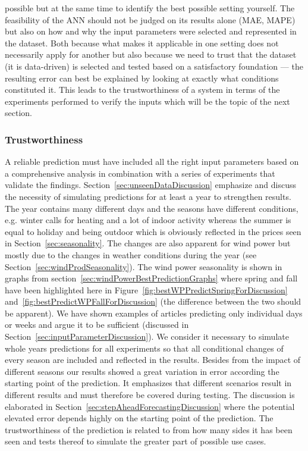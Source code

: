 possible but at the same time to identify the best possible setting yourself. The feasibility of the ANN should not be judged on its results alone (MAE, MAPE) but also on how and why the input parameters were selected and represented in the dataset. Both because what makes it applicable in one setting does not necessarily apply for another but also because we need to trust that the dataset (it is data-driven) is selected and tested based on a satisfactory foundation --- the resulting error can best be explained by looking at exactly what conditions constituted it. This leads to the trustworthiness of a system in terms of the experiments performed to verify the inputs which will be the topic of the next section.  

\todo{show the article that]}


\subsubsection{Trustworthiness}
A reliable prediction must have included all the right input parameters based on a comprehensive analysis in combination with a series of experiments that validate the findings. Section~\ref{sec:unseenDataDiscussion} emphasize and discuss the necessity of simulating predictions for at least a year to strengthen results. The year contains many different days and the seasons have different conditions, e.g. winter calls for heating and a lot of indoor activity whereas the summer is equal to holiday and being outdoor which is obviously reflected in the prices seen in Section~\ref{sec:seasonality}. The changes are also apparent for wind power but mostly due to the changes in weather conditions during the year (see Section~\ref{sec:windProdSeasonality}). The wind power seasonality is shown in graphs from section~\ref{sec:windPowerBestPredictionGraphs} where spring and fall have been highlighted here in Figure~\ref{fig:bestWPPredictSpringForDiscussion} and~\ref{fig:bestPredictWPFallForDiscussion} (the difference between the two should be apparent). We have shown examples of articles predicting only individual days or weeks and argue it to be sufficient (discussed in Section~\ref{sec:inputParameterDiscussion}). We consider it necessary to simulate whole years predictions for all experiments so that all conditional changes of every season are included and reflected in the results. Besides from the impact of different seasons our results showed a great variation in error according the starting point of the prediction. It emphasizes that different scenarios result in different results and must therefore be covered during testing. The discussion is elaborated in Section~\ref{sec:stepAheadForecastingDiscussion} where the potential elevated error depends highly on the starting point of the prediction. The trustworthiness of the prediction is related to from how many sides it has been seen and tests thereof to simulate the greater part of possible use cases. 

